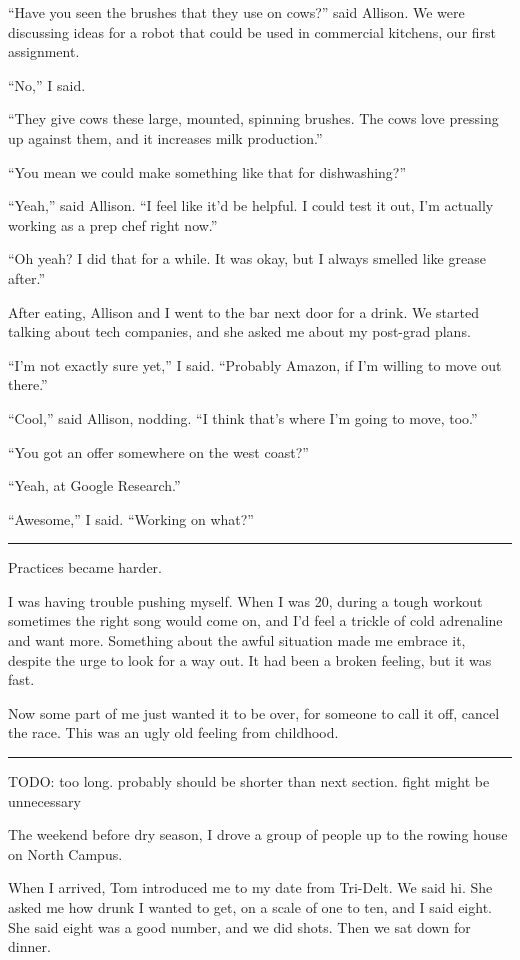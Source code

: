 ``Have you seen the brushes that they use on cows?'' said Allison.  We were
discussing ideas for a robot that could be used in commercial kitchens, our
first assignment.

``No,'' I said.

``They give cows these large, mounted, spinning brushes. The cows love pressing
up against them, and it increases milk production.'' 

``You mean we could make something like that for dishwashing?''

``Yeah,'' said Allison.  ``I feel like it'd be helpful.  I could test it out,
I'm actually working as a prep chef right now.''

``Oh yeah?  I did that for a while.  It was okay, but I always smelled like
grease after.''

After eating, Allison and I went to the bar next door for a drink.  We started
talking about tech companies, and she asked me about my post-grad plans.  

``I'm not exactly sure yet,'' I said.  ``Probably Amazon, if I'm willing to move
out there.''

``Cool,'' said Allison, nodding.  ``I think that's where I'm going to move,
too.''

``You got an offer somewhere on the west coast?''

``Yeah, at Google Research.''

``Awesome,'' I said.  ``Working on what?''

\plainfancybreak{12pt}{2}{* * *}

Practices became harder.

I was having trouble pushing myself.  When I was 20, during a tough workout
sometimes the right song would come on, and I'd feel a trickle of cold
adrenaline and want more.  Something about the awful situation made me embrace
it, despite the urge to look for a way out.  It had been a broken feeling, but
it was fast.

Now some part of me just wanted it to be over, for someone to call it off,
cancel the race.  This was an ugly old feeling from childhood.

\plainfancybreak{12pt}{2}{}

TODO: too long.  probably should be shorter than next section.  fight might be
unnecessary

The weekend before dry season, I drove a group of people up to the rowing house
on North Campus.

When I arrived, Tom introduced me to my date from Tri-Delt.  We said hi.  She
asked me how drunk I wanted to get, on a scale of one to ten, and I said eight.
She said eight was a good number, and we did shots.  Then we sat down for
dinner.

